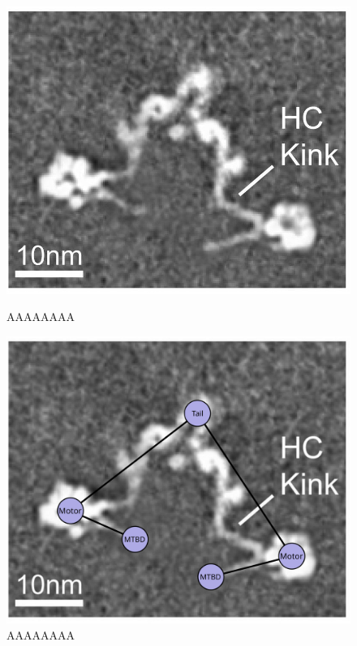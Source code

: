 \documentclass{article}
\begin{document}
\begin{figure}%
\centering
 \begin{minipage}{.3\textwidth}
   \centering
   \includegraphics[width=\linewidth]{figures/schematic-1-cryoem}
   \caption{AAAAAAAA}
   \label{fig:modlengths}
 \end{minipage}%
 \begin{minipage}{.3\textwidth}
   \centering
   \includegraphics[width=\linewidth]{figures/schematic-1-superimposed}
   \caption{AAAAAAAA}
   \label{fig:modlengths}
 \end{minipage}%

\end{figure}
\end{document}
